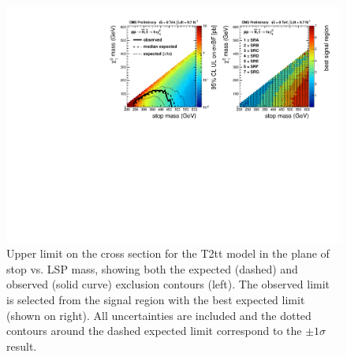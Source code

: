  \begin{figure}[hbt]
  \begin{center}
       \includegraphics[width=1.\linewidth]{plots/T2tt_combined.pdf}%
    \caption{Upper limit on the cross section for the T2tt model in
      the plane of stop vs. LSP mass, showing
      both the expected (dashed) and observed (solid curve) exclusion
      contours (left). The observed
      limit is selected from the signal region with the best expected
      limit (shown on right). All uncertainties are included and the
      dotted contours around the dashed expected limit correspond to
      the $\pm 1\sigma$ result.}
\label{fig:comblimit}
      \end{center}
\end{figure}

